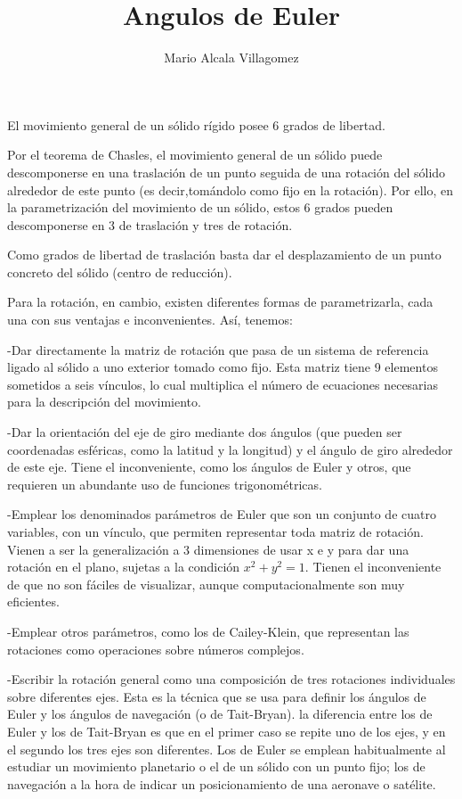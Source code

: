 \documentclass[12pt,a4paper]{report}
\author{Mario Alcala Villagomez}
\title{Angulos de Euler}
\begin{document}
\maketitle
El movimiento general de un sólido rígido posee 6 grados de libertad.

Por el teorema de Chasles, el movimiento general de un sólido puede descomponerse en una traslación de un punto seguida de una rotación del sólido alrededor de este punto (es decir,tomándolo como fijo en la rotación). Por ello, en la parametrización del movimiento de un sólido, estos 6 grados pueden descomponerse en 3 de traslación y tres de rotación.

Como grados de libertad de traslación basta dar el desplazamiento de un punto concreto del sólido (centro de reducción).

Para la rotación, en cambio, existen diferentes formas de parametrizarla, cada una con sus ventajas e inconvenientes. Así, tenemos:

-Dar directamente la matriz de rotación que pasa de un sistema de referencia ligado al sólido a uno exterior tomado como fijo. Esta matriz tiene 9 elementos sometidos a seis vínculos, lo cual multiplica el número de ecuaciones necesarias para la descripción del movimiento.

-Dar la orientación del eje de giro mediante dos ángulos (que pueden ser coordenadas esféricas, como la latitud y la longitud) y el ángulo de giro alrededor de este eje. Tiene el inconveniente, como los ángulos de Euler y otros, que requieren un abundante uso de funciones trigonométricas.

-Emplear los denominados parámetros de Euler que son un conjunto de cuatro variables, con un vínculo, que permiten representar toda matriz de rotación. Vienen a ser la generalización a 3 dimensiones de usar x e y para dar una rotación en el plano, sujetas a la condición $x^{2}+y^{2}=1$. Tienen el inconveniente de que no son fáciles de visualizar, aunque computacionalmente son muy eficientes.

-Emplear otros parámetros, como los de Cailey-Klein, que representan las rotaciones como operaciones sobre números complejos.

-Escribir la rotación general como una composición de tres rotaciones individuales sobre diferentes ejes. Esta es la técnica que se usa para definir los ángulos de Euler y los ángulos de navegación (o de Tait-Bryan). la diferencia entre los de Euler y los de Tait-Bryan es que en el primer caso se repite uno de los ejes, y en el segundo los tres ejes son diferentes. Los de Euler se emplean habitualmente al estudiar un movimiento planetario o el de un sólido con un punto fijo; los de navegación a la hora de indicar un posicionamiento de una aeronave o satélite.
\end{document}

